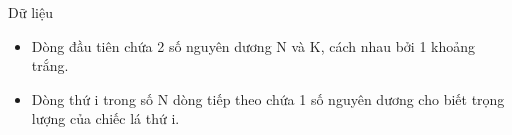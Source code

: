 Dữ liệu
\begin{itemize}
	\item     Dòng đầu tiên chứa 2 số nguyên dương N và K, cách nhau bởi 1 khoảng trắng.   
	\item     Dòng thứ i trong số N dòng tiếp theo chứa 1 số nguyên dương cho biết trọng lượng của chiếc lá thứ i.   
\end{itemize}